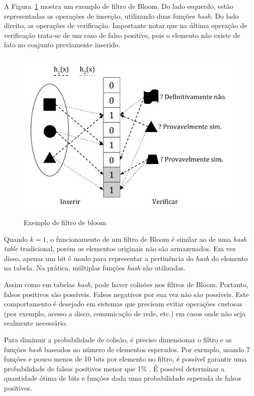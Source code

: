 A Figura~\ref{fig:bloom1} mostra um exemplo de filtro de Bloom. Do lado esquerdo, estão representadas as operações de inserção, utilizando duas funções \emph{hash}. Do lado direito, as operações de verificação. Importante notar que na última operação de verificação trata-se de um caso de falso positivo, pois o elemento não existe de fato no conjunto previamente inserido.

\begin{figure}[!htbp]
  \centering
  \includegraphics[scale=0.45]{figures/bloom1.pdf}
  \caption{Exemplo de filtro de bloom}
  \label{fig:bloom1}
\end{figure}

Quando $k=1$, o funcionamento de um filtro de Bloom é similar ao de uma \emph{hash table} tradicional, porém os elementos originais não são armazenados. Em vez disso, apenas um bit é usado para representar a pertinência do \emph{hash} do elemento na tabela. Na prática, múltiplas funções \emph{hash} são utilizadas.

Assim como em tabelas \emph{hash}, pode haver colisões nos filtros de Bloom. Portanto, falsos positivos são possíveis. Falsos negativos por sua vez não são possíveis. Este comportamento é desejado em sistemas que precisam evitar operações custosas (por exemplo, acesso a disco, comunicação de rede, etc.) em casos onde não seja realmente necessário. 

Para diminuir a probabilidade de colisão, é preciso dimensionar o filtro e as funções \emph{hash} baseados no número de elementos esperados. Por exemplo, usando 7 funções e pouco menos de 10 bits por elemento no filtro, é possível garantir uma probabilidade de falsos positivos menor que 1\% \cite{bonomi2006improved}. É possível determinar a quantidade ótima de bits e funções dada uma probabilidade esperada de falsos positivos.

